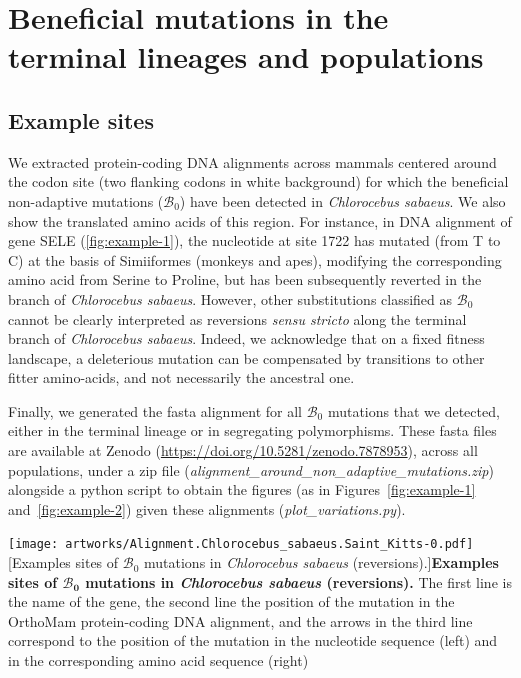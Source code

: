 \documentclass{article}
\newcommand{\SphyBen}{\mathcal{B}_0}
\begin{document}
    \section{Beneficial mutations in the terminal lineages and populations}\label{sec:beneficial-mutations}

    \subsection{Example sites}\label{subsec:example-sites}

    We extracted protein-coding DNA alignments across mammals centered around the codon site (two flanking codons in white background) for which the beneficial non-adaptive mutations ($\SphyBen$) have been detected in \textit{Chlorocebus sabaeus}.
    We also show the translated amino acids of this region.
    For instance, in DNA alignment of gene SELE (\ref{fig:example-1}), the nucleotide at site 1722 has mutated (from T to C) at the basis of Simiiformes (monkeys and apes), modifying the corresponding amino acid from Serine to Proline, but has been subsequently reverted in the branch of \textit{Chlorocebus sabaeus}.
    However, other substitutions classified as $\SphyBen$ cannot be clearly interpreted as reversions \textit{sensu stricto} along the terminal branch of \textit{Chlorocebus sabaeus}.
    Indeed, we acknowledge that on a fixed fitness landscape, a deleterious mutation can be compensated by transitions to other fitter amino-acids, and not necessarily the ancestral one.

    Finally, we generated the fasta alignment for all $\SphyBen$ mutations that we detected, either in the terminal lineage or in segregating polymorphisms.
    These fasta files are available at Zenodo (\url{https://doi.org/10.5281/zenodo.7878953}), across all populations, under a zip file (\textit{alignment\_around\_non\_adaptive\_mutations.zip}) alongside a python script to obtain the figures (as in Figures~\ref{fig:example-1} and~\ref{fig:example-2}) given these alignments (\textit{plot\_variations.py}).

    \newpage
    \begin{center}
        \texttt{[image: artworks/Alignment.Chlorocebus\_sabaeus.Saint\_Kitts-0.pdf]}
        [Examples sites of $\SphyBen$ mutations in \textit{Chlorocebus sabaeus} (reversions).]{\textbf{Examples sites of $\bm{\SphyBen}$ mutations in \textit{Chlorocebus sabaeus}  (reversions).} The first line is the name of the gene, the second line the position of the mutation in the OrthoMam protein-coding DNA alignment, and the arrows in the third line correspond to the position of the mutation in the nucleotide sequence (left) and in the corresponding amino acid sequence (right)\label{fig:example-1}}
    \end{center}
\end{document}
